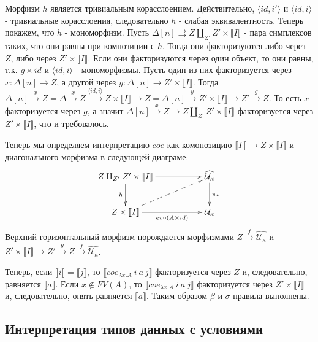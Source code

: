 \documentclass{amsart}
\theoremstyle{definition}
\theoremstyle{remark}
\renewcommand{\ll}{\llbracket}
\newcommand{\rr}{\rrbracket}
\numberwithin{figure}{section}
\begin{document}
\begin{itemize}
Морфизм $h$ является тривиальным корасслоением.
Действительно, $\langle id, i' \rangle$ и $\langle id, i \rangle$ - тривиальные корасслоения, следовательно $h$ - слабая эквивалентность.
Теперь покажем, что $h$ - мономорфизм.
Пусть $\Delta[n] \rightrightarrows Z \amalg_{Z'} Z' \times \ll I \rr$ - пара симплексов таких, что они равны при композиции с $h$.
Тогда они факторизуются либо через $Z$, либо через $Z' \times \ll I \rr$.
Если они факторизуются через один объект, то они равны, т.к. $g \times id$ и $\langle id, i \rangle$ - мономорфизмы.
Пусть один из них факторизуется через $x : \Delta[n] \to Z$, а другой через $y : \Delta[n] \to Z' \times \ll I \rr$.
Тогда $\Delta[n] \xrightarrow{x} Z = \Delta \xrightarrow{x} Z \xrightarrow{\langle id, i \rangle} Z \times \ll I \rr \to Z = \Delta[n] \xrightarrow{y} Z' \times \ll I \rr \to Z' \xrightarrow{g} Z$.
То есть $x$ факторизуется через $g$, а значит $\Delta[n] \xrightarrow{x} Z \to Z \amalg_{Z'} Z' \times \ll I \rr$ факторизуется через $Z' \times \ll I \rr$, что и требовалось.

Теперь мы определяем интерпретацию $coe$ как комопозицию $\ll \Gamma \rr \to Z \times \ll I \rr$ и диагонального морфизма в следующей диаграме:
\[ \xymatrix{ Z \amalg_{Z'} Z' \times \ll I \rr \ar[rr] \ar[d]_h                  & & \widehat{\mathcal{U}_\kappa} \ar[d]^{\pi_\kappa} \\
              Z \times \ll I \rr \ar[rr]_-{ev \circ (A \times id)} \ar@{-->}[urr] & & \mathcal{U}_\kappa
            }\]
Верхний горизонтальный морфизм порождается морфизмами $Z \xrightarrow{f} \widehat{\mathcal{U}_\kappa}$
    и $Z' \times \ll I \rr \to Z' \xrightarrow{g} Z \xrightarrow{f} \widehat{\mathcal{U}_\kappa}$.

Теперь, если $\ll i \rr = \ll j \rr$, то $\ll coe_{\lambda x. A}\ i\ a\ j \rr$ факторизуется через $Z$ и, следовательно, равняется $\ll a \rr$.
Если $x \notin FV(A)$, то $\ll coe_{\lambda x. A}\ i\ a\ j \rr$ факторизуется через $Z' \times \ll I \rr$ и, следовательно, опять равняется $\ll a \rr$.
Таким образом $\beta$ и $\sigma$ правила выполнены.
\end{itemize}

\subsection{Интерпретация типов данных с условиями}
\end{document}
